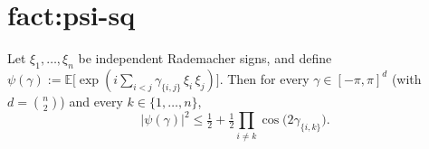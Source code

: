 \chapter{fact:psi-sq}\label{chap:fact_psi_sq}
\begin{lemma}
\label{fact:psi-sq}
Let $\xi_1, \dots, \xi_n$ be independent Rademacher signs, and define
$\psi(\gamma) := \mathbb{E}\bigl[\exp(i \sum_{i<j} \gamma_{\{i,j\}}\,\xi_i\,\xi_j)\bigr]$.
Then for every $\gamma \in [-\pi,\pi]^d$ (with $d=\binom{n}{2}$) and every
$k \in \{1, \dots, n\}$,
\[
  |\psi(\gamma)|^2 \le \tfrac12 + \tfrac12 \prod_{i\ne k}\cos\bigl(2\gamma_{\{i,k\}}\bigr).
\]
\end{lemma}
